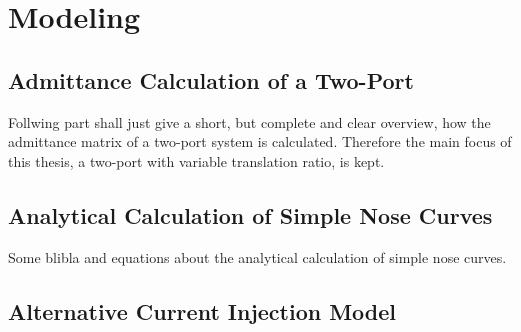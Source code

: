 \chapter{Modeling}

\section{Admittance Calculation of a Two-Port}
\label{app:admittance-deduction}

Follwing part shall just give a short, but complete and clear overview, how the admittance matrix of a two-port system is calculated.
Therefore the main focus of this thesis, a two-port with variable translation ratio, is kept.

\section{Analytical Calculation of Simple Nose Curves}
\label{app:analytical-nose-curve}

Some blibla and equations about the analytical calculation of simple nose curves.


\section{Alternative Current Injection Model}
\label{app:current-injection-model}

